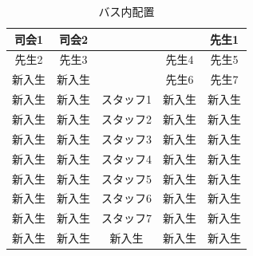 

\begin{table}[htb]
  \begin{center}
  \begin{tabular}{|c|c||c||c|c|} \hline
  司会1  & 司会2  &           &        & 先生1 \\ \hline
  先生2  & 先生3  &           & 先生4  & 先生5 \\ \hline
  新入生 & 新入生 &           & 先生6  & 先生7  \\ \hline
  新入生 & 新入生 & スタッフ1 & 新入生 & 新入生 \\ \hline
  新入生 & 新入生 & スタッフ2 & 新入生 & 新入生 \\ \hline
  新入生 & 新入生 & スタッフ3 & 新入生 & 新入生 \\ \hline
  新入生 & 新入生 & スタッフ4 & 新入生 & 新入生 \\ \hline
  新入生 & 新入生 & スタッフ5 & 新入生 & 新入生 \\ \hline
  新入生 & 新入生 & スタッフ6 & 新入生 & 新入生 \\ \hline
  新入生 & 新入生 & スタッフ7 & 新入生 & 新入生 \\ \hline
  新入生 & 新入生 &  新入生  & 新入生 & 新入生  \\ \hline

  \end{tabular}
\caption{バス内配置}
  \end{center}
\end{table}

